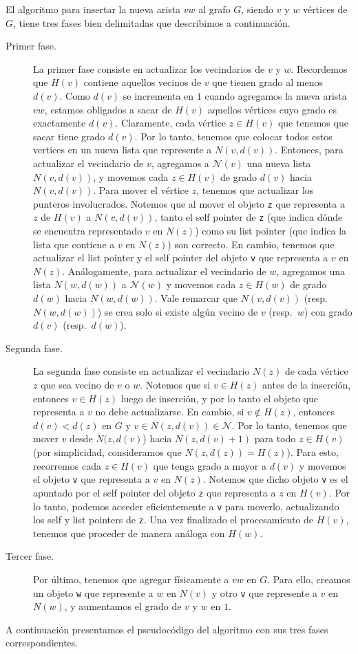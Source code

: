 \documentclass[a4paper,12pt]{article}
\newcommand{\N}{\mathcal{N}}
\begin{document}
El algoritmo para insertar la nueva arista $vw$ al grafo $G$, siendo $v$ y $w$ vértices de $G$, tiene tres fases bien delimitadas que describimos a continuación.
\begin{description}
\item [Primer fase.] La primer fase consiste en actualizar los vecindarios de $v$ y $w$.  Recordemos que $H(v)$ contiene aquellos vecinos de $v$ que tienen grado al menos $d(v)$.  Como $d(v)$ se incrementa en $1$ cuando agregamos la nueva arista $vw$, estamos obligados a sacar de $H(v)$ aquellos vértices cuyo grado es exactamente $d(v)$.  Claramente, cada vértice $z \in H(v)$ que tenemos que sacar tiene grado $d(v)$.  Por lo tanto, tenemos que colocar todos estos vertices en un nueva lista que represente a $N(v, d(v))$.  Entonces, para actualizar el vecindario de $v$,  agregamos a $\N(v)$ una nueva lista $N(v,d(v))$, y movemos cada $z \in H(v)$ de grado $d(v)$ hacia $N(v,d(v))$.  Para mover el vértice $z$, tenemos que actualizar los punteros involucrados.  Notemos que al mover el objeto \texttt{z} que representa a $z$ de $H(v)$ a $N(v, d(v))$, tanto el self pointer de \texttt{z} (que indica dónde se encuentra representado $v$ en $N(z)$) como su list pointer (que indica la lista que contiene a $v$ en $N(z)$) son correcto.  En cambio, tenemos que actualizar el list pointer y el self pointer del objeto \texttt{v} que representa a $v$ en $N(z)$.  Análogamente, para actualizar el vecindario de $w$, agregamos una lista $N(w, d(w))$ a $\N(w)$ y movemos cada $z \in H(w)$ de grado $d(w)$ hacia $N(w, d(w))$.  Vale remarcar que $N(v,d(v))$ (resp.\ $N(w, d(w))$) se crea solo si existe algún vecino de $v$ (resp.\ $w$) con grado $d(v)$ (resp.\ $d(w)$).  

\item [Segunda fase.]  La segunda fase consiste en actualizar el vecindario $N(z)$ de cada vértice $z$ que sea vecino de $v$ o $w$.  Notemos que si $v \in H(z)$ antes de la inserción, entonces $v \in H(z)$ luego de inserción, y por lo tanto el objeto que representa a $v$ no debe actualizarse.  En cambio, si $v \not\in H(z)$, entonces $d(v) < d(z)$ en $G$ y $v \in N(z, d(v)) \in \N$.  Por lo tanto, tenemos que mover $v$ desde $N(z,d(v)$) hacia $N(z, d(v)+1)$ para todo $z \in H(v)$ (por simplicidad, consideramos que $N(z, d(z)) = H(z)$).  Para esto, recorremos cada $z \in H(v)$ que tenga grado a mayor a $d(v)$ y movemos el objeto \texttt{v} que representa a $v$ en $N(z)$.  Notemos que dicho objeto \texttt{v} es el apuntado por el self pointer del objeto \texttt{z} que representa a $z$ en $H(v)$.  Por lo tanto, podemos acceder eficientemente a \texttt{v} para moverlo, actualizando los self y list pointers de \texttt{z}.  Una vez finalizado el procesamiento de $H(v)$, tenemos que proceder de manera análoga con $H(w)$.
%
\item [Tercer fase.] Por último, tenemos que agregar físicamente a $vw$ en $G$.  Para ello, creamos un objeto \texttt{w} que represente a $w$ en $N(v)$ y otro \texttt{v} que represente a $v$ en $N(w)$, y aumentamos el grado de $v$ y $w$ en $1$.
\end{description}
A continuación presentamos el pseudocódigo del algoritmo con sus tres fases correspondientes.
\end{document}
